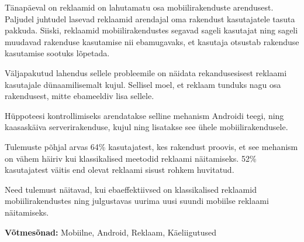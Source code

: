 \begin{abstracts}

Tänapäeval on reklaamid on lahutamatu osa mobiilirakenduste arendusest. Paljudel juhtudel lasevad reklaamid arendajal oma rakendust kasutajatele tasuta pakkuda. Siiski, reklaamid mobiilirakendustes segavad sageli kasutajat ning sageli muudavad rakenduse kasutamise nii ebamugavaks, et kasutaja otsustab rakenduse kasutamise sootuks lõpetada.

Väljapakutud lahendus sellele probleemile on näidata rekandusesisest reklaami kasutajale dünaamilisemalt kujul. Sellisel moel, et reklaam tunduks nagu osa rakendusest, mitte ebameeldiv lisa sellele.

Hüppoteesi kontrollimiseks arendatakse selline mehanism Androidi teegi, ning kaasaskäiva serverirakenduse, kujul ning lisatakse see ühele mobiilirakendusele.

Tulemuste põhjal arvas 64\% kasutajatest, kes rakendust proovis, et see mehanism on vähem häiriv kui klassikalised meetodid reklaami näitamiseks. 52\% kasutajatest väitis end olevat reklaami sisust rohkem huvitatud.

Need tulemust näitavad, kui ebaeffektiivsed on klassikalised reklaamid mobiilirakendustes ning julgustavas uurima uusi suundi mobiilse reklaami näitamiseks.

\bigskip

\textbf{Võtmesõnad:} Mobiilne, Android, Reklaam, Käeliigutused

\end{abstracts}